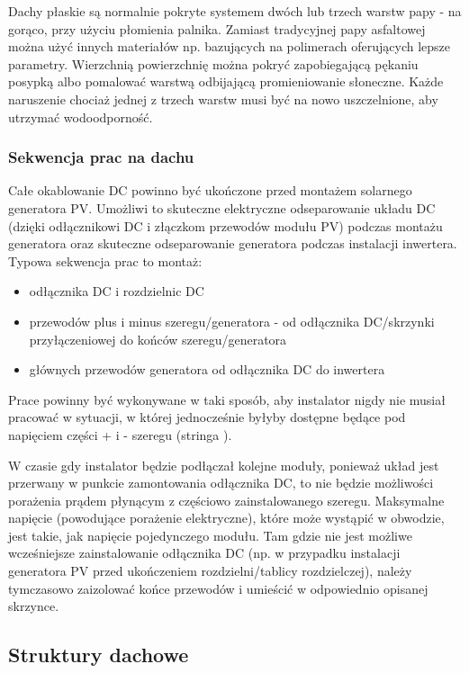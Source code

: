 \documentclass[12pt,a4paper]{article}
\begin{document}
Dachy płaskie są normalnie pokryte systemem dwóch lub trzech warstw papy 
- na gorąco, przy użyciu płomienia palnika. Zamiast tradycyjnej papy 
asfaltowej można użyć innych materiałów np. bazujących na polimerach 
oferujących lepsze parametry. Wierzchnią powierzchnię można pokryć 
zapobiegającą pękaniu posypką albo pomalować warstwą odbijającą 
promieniowanie słoneczne. Każde naruszenie chociaż jednej z trzech 
warstw musi być na nowo uszczelnione, aby utrzymać wodoodporność. 

\subsubsection{Sekwencja prac na dachu}
  

Całe okablowanie DC powinno być ukończone przed montażem solarnego 
generatora PV. Umożliwi to skuteczne elektryczne odseparowanie układu DC 
(dzięki odłącznikowi DC i złączkom przewodów modułu PV) podczas montażu 
generatora oraz skuteczne odseparowanie generatora podczas instalacji 
inwertera. Typowa sekwencja prac to montaż: 

\begin{itemize}
\item odłącznika DC i rozdzielnic DC 
\item przewodów plus i minus szeregu/generatora - od odłącznika 
DC/skrzynki przyłączeniowej do końców szeregu/generatora 
\item głównych przewodów generatora od odłącznika DC do inwertera 
\end{itemize}
 

Prace powinny być wykonywane w taki sposób, aby instalator nigdy nie 
musiał pracować w sytuacji, w której jednocześnie byłyby dostępne będące 
pod napięciem części + i - szeregu (stringa ). 

W czasie gdy instalator będzie podłączał kolejne moduły, ponieważ układ 
jest przerwany w punkcie zamontowania odłącznika DC, to nie będzie 
możliwości porażenia prądem płynącym z częściowo zainstalowanego 
szeregu. Maksymalne napięcie (powodujące porażenie elektryczne), które 
może wystąpić w obwodzie, jest takie, jak napięcie pojedynczego modułu. 
Tam gdzie nie jest możliwe wcześniejsze zainstalowanie odłącznika DC 
(np. w przypadku instalacji generatora PV przed ukończeniem 
rozdzielni/tablicy rozdzielczej), należy tymczasowo zaizolować końce 
przewodów i umieścić w odpowiednio opisanej skrzynce. 

\subsection{Struktury dachowe}
\end{document}
